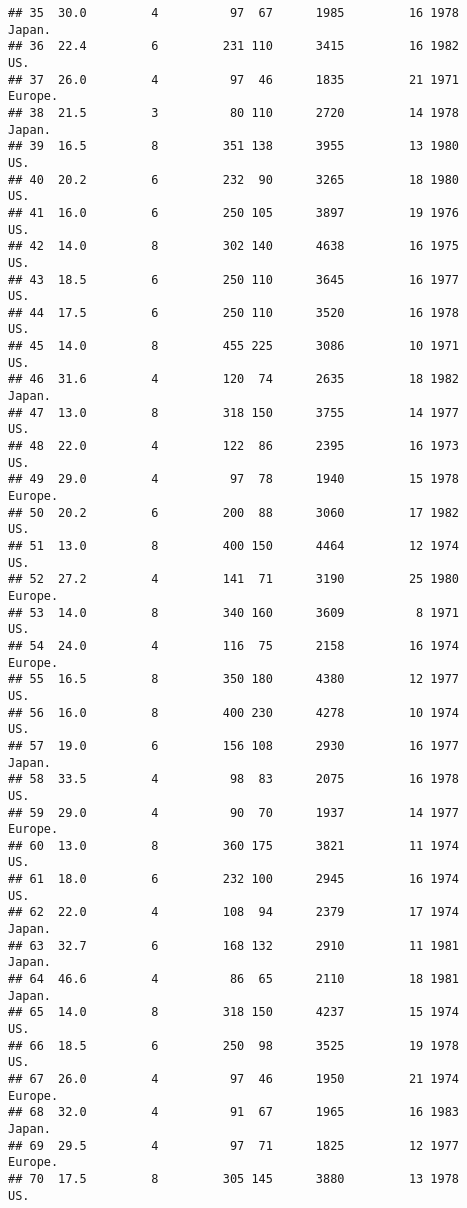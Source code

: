 \documentclass[11pt,]{article}
\begin{document}
\begin{verbatim}
## 35  30.0         4          97  67      1985         16 1978   Japan.
## 36  22.4         6         231 110      3415         16 1982      US.
## 37  26.0         4          97  46      1835         21 1971  Europe.
## 38  21.5         3          80 110      2720         14 1978   Japan.
## 39  16.5         8         351 138      3955         13 1980      US.
## 40  20.2         6         232  90      3265         18 1980      US.
## 41  16.0         6         250 105      3897         19 1976      US.
## 42  14.0         8         302 140      4638         16 1975      US.
## 43  18.5         6         250 110      3645         16 1977      US.
## 44  17.5         6         250 110      3520         16 1978      US.
## 45  14.0         8         455 225      3086         10 1971      US.
## 46  31.6         4         120  74      2635         18 1982   Japan.
## 47  13.0         8         318 150      3755         14 1977      US.
## 48  22.0         4         122  86      2395         16 1973      US.
## 49  29.0         4          97  78      1940         15 1978  Europe.
## 50  20.2         6         200  88      3060         17 1982      US.
## 51  13.0         8         400 150      4464         12 1974      US.
## 52  27.2         4         141  71      3190         25 1980  Europe.
## 53  14.0         8         340 160      3609          8 1971      US.
## 54  24.0         4         116  75      2158         16 1974  Europe.
## 55  16.5         8         350 180      4380         12 1977      US.
## 56  16.0         8         400 230      4278         10 1974      US.
## 57  19.0         6         156 108      2930         16 1977   Japan.
## 58  33.5         4          98  83      2075         16 1978      US.
## 59  29.0         4          90  70      1937         14 1977  Europe.
## 60  13.0         8         360 175      3821         11 1974      US.
## 61  18.0         6         232 100      2945         16 1974      US.
## 62  22.0         4         108  94      2379         17 1974   Japan.
## 63  32.7         6         168 132      2910         11 1981   Japan.
## 64  46.6         4          86  65      2110         18 1981   Japan.
## 65  14.0         8         318 150      4237         15 1974      US.
## 66  18.5         6         250  98      3525         19 1978      US.
## 67  26.0         4          97  46      1950         21 1974  Europe.
## 68  32.0         4          91  67      1965         16 1983   Japan.
## 69  29.5         4          97  71      1825         12 1977  Europe.
## 70  17.5         8         305 145      3880         13 1978      US.

\end{verbatim}
\end{document}
